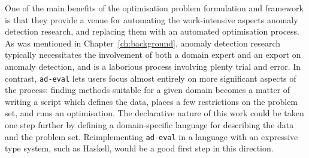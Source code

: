 One of the main benefits of the optimisation problem formulation and framework is that they provide a venue for automating the work-intensive aspects anomaly detection research, and replacing them with an automated optimisation process. As was mentioned in Chapter~\ref{ch:background}, anomaly detection research typically necessitates the involvement of both a domain expert and an export on anomaly detection, and is a laborious process involving plenty trial and error. In contrast, \texttt{ad-eval} lets users focus almost entirely on more significant aspects of the process: finding methods suitable for a given domain becomes a matter of writing a script which defines the data, places a few restrictions on the problem set, and runs an optimisation. The declarative nature of this work could be taken one step further by defining a domain-specific language for describing the data and the problem set. Reimplementing \texttt{ad-eval} in a language with an expressive type system, such as Haskell, would be a good first step in this direction.
